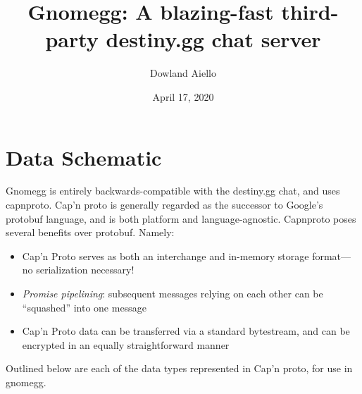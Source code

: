 \documentclass{article}
\begin{document}
\title{Gnomegg: A blazing-fast third-party destiny.gg chat server}
\author{Dowland Aiello}
\date{April 17, 2020}

\maketitle
\tableofcontents
\fancyhf{}

\newpage

\section{Data Schematic}

Gnomegg is entirely backwards-compatible with the destiny.gg chat, and uses
capnproto. Cap'n proto is generally regarded as the successor to Google's
protobuf language, and is both platform and language-agnostic. Capnproto poses
several benefits over protobuf. Namely:

\begin{itemize}
	\item Cap'n Proto serves as both an interchange and in-memory storage
		format---no serialization necessary!
	\item \emph{Promise pipelining}: subsequent messages relying on each other
		can be ``squashed'' into one message
	\item Cap'n Proto data can be transferred via a standard bytestream, and can
		be encrypted in an equally straightforward manner
\end{itemize}

Outlined below are each of the data types represented in Cap'n proto, for use
in gnomegg.
\end{document}
